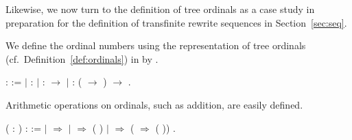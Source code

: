 Likewise, we now turn to the definition of tree ordinals as a case study in
preparation for the definition of transfinite rewrite sequences in
Section~\ref{sec:seq}.

We define the ordinal numbers using the representation of tree
ordinals (cf.~Definition~\ref{def:ordinals}) in \Coq by
.
\begin{singlespace}
\begin{coqdoccode}
\coqdocnoindent
{}  :
 :=\coqdoceol
\coqdocindent{1.00em}
\ensuremath{|}   :
\coqdoceol
\coqdocindent{1.00em}
\ensuremath{|}   :
 \ensuremath{\rightarrow}
\coqdoceol
\coqdocindent{1.00em}
\ensuremath{|}  :
(
\ensuremath{\rightarrow} )
\ensuremath{\rightarrow}
.\coqdoceol
\end{coqdoccode}
\end{singlespace}
Arithmetic operations on ordinals, such as addition, are easily
defined.
\begin{singlespace}
\begin{coqdoccode}
\coqdocnoindent
{} 
(\coqdocvar{$\alpha$} \coqdocvar{$\beta$} :
) :
 :=\coqdoceol
\coqdocindent{1.00em}
 \coqdocvariable{$\beta$} \coqdoceol
\coqdocindent{1.00em}
\ensuremath{|} 
\ensuremath{\Rightarrow} \coqdocvariable{$\alpha$}\coqdoceol
\coqdocindent{1.00em}
\ensuremath{|} 
\coqdocvar{$\beta$} \ensuremath{\Rightarrow}
(\coqdocvariable{$\alpha$} 
\coqdocvariable{$\beta$})\coqdoceol
\coqdocindent{1.00em}
\ensuremath{|} 
   \ensuremath{\Rightarrow}
 (
 \ensuremath{\Rightarrow}
\coqdocvariable{$\alpha$} 
( ))\coqdoceol
\coqdocindent{1.00em}
.\coqdoceol
\end{coqdoccode}
\end{singlespace}
